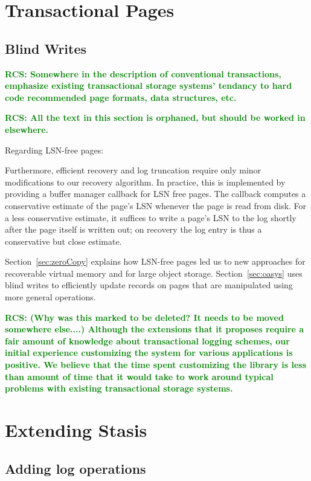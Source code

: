\documentclass[letterpaper,twocolumn,10pt]{article}
\newcommand{\yad}{Stasis\xspace}
\newcommand{\rcs}[1]{\textcolor{green}{\bf RCS: #1}}
\begin{document}
\section{Transactional Pages}

\subsection{Blind Writes}
\label{sec:blindWrites}
\rcs{Somewhere in the description of conventional transactions, emphasize existing transactional storage systems' tendancy to hard code recommended page formats, data structures, etc.}

\rcs{All the text in this section is orphaned, but should be worked in elsewhere.}

Regarding LSN-free pages:

Furthermore, efficient recovery and
log truncation require only minor modifications to our recovery
algorithm.  In practice, this is implemented by providing a buffer manager callback
for LSN free pages.  The callback computes a
conservative estimate of the page's LSN whenever the page is read from disk.
For a less conservative estimate, it suffices to write a page's LSN to
the log shortly after the page itself is written out; on recovery the
log entry is thus a conservative but close estimate.

Section~\ref{sec:zeroCopy} explains how LSN-free pages led us to new 
approaches for recoverable virtual memory and for large object storage.  
Section~\ref{sec:oasys} uses blind writes to efficiently update records 
on pages that are manipulated using more general operations.  

\rcs{ (Why was this marked to be deleted?  It needs to be moved somewhere else....)
Although the extensions that it proposes
require a fair amount of knowledge about transactional logging
schemes, our initial experience customizing the system for various
applications is positive.  We believe that the time spent customizing
the library is less than amount of time that it would take to work
around typical problems with existing transactional storage systems.
}



\section{Extending \yad}
\subsection{Adding log operations}
\label{sec:wal}
\end{document}
